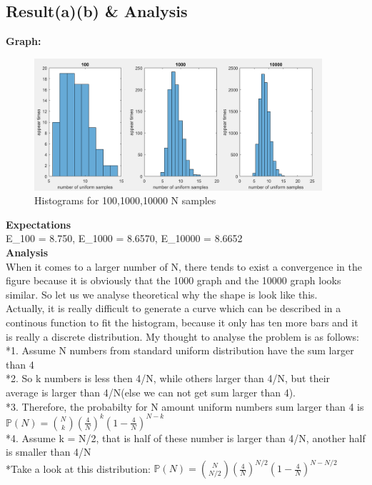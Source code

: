 \documentclass[twoside]{article}
\begin{document}
\subsection{\normalsize{Result(a)(b) \& Analysis}}
\noindent \textbf {Graph:}
\begin{figure}[H]%
   \centering
   \includegraphics[width = 0.95\textwidth]{../data/solution3.png}  
   \caption{Histograms for 100,1000,10000 N samples}
\end{figure}
\noindent \textbf {Expectations}\\
E\_100 = 8.750,  E\_1000 = 8.6570, E\_10000 = 8.6652\\
\noindent \textbf {Analysis}\\
When it comes to a larger number of N, there tends to exist a convergence in the figure because it is obviously that the 1000 graph and the 10000 graph looks similar. So let us we analyse theoretical why the shape is look like this.\\
Actually, it is really difficult to generate a curve which can be described in a continous function to fit the histogram, because it only has ten more bars and it is really a discrete distribution. My thought to analyse the problem is as follows:\\
*1. Assume N numbers from standard uniform distribution have the sum larger than 4\\
*2. So k numbers is less then 4/N, while others larger than 4/N, but their average is larger than 4/N(else we can not get sum larger than 4).\\
*3. Therefore, the probabilty for N amount uniform numbers sum larger than 4 is $\mathbb{P}(N)= \binom{N}{k}(\frac{4}{N})^k(1-\frac{4}{N})^{N-k}$\\
*4. Assume k = N/2, that is half of these number is larger than 4/N, another half is smaller than 4/N\\ 
*Take a look at this distribution:  $\mathbb{P}(N)= \binom{N}{N/2}(\frac{4}{N})^{N/2}(1-\frac{4}{N})^{N-N/2}$\\
\end{document}
